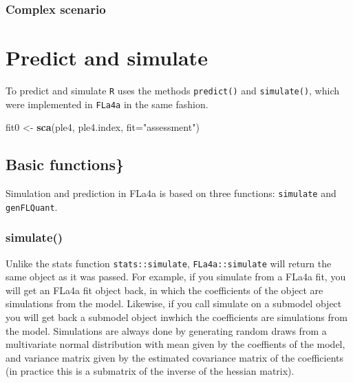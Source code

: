 \documentclass[
]{book}
\newenvironment{Shaded}{\begin{snugshade}}{\end{snugshade}}
\newcommand{\AttributeTok}[1]{\textcolor[rgb]{0.13,0.29,0.53}{#1}}
\newcommand{\FunctionTok}[1]{\textcolor[rgb]{0.13,0.29,0.53}{\textbf{#1}}}
\newcommand{\NormalTok}[1]{#1}
\newcommand{\OtherTok}[1]{\textcolor[rgb]{0.56,0.35,0.01}{#1}}
\newcommand{\StringTok}[1]{\textcolor[rgb]{0.31,0.60,0.02}{#1}}
\begin{document}
\hypertarget{complex-scenario}{%
\subsection{Complex scenario}\label{complex-scenario}}

\hypertarget{predict-and-simulate}{%
\chapter{\texorpdfstring{Predict and simulate \label{sec:predsim}}{Predict and simulate }}\label{predict-and-simulate}}

To predict and simulate \texttt{R} uses the methods \texttt{predict()} and \texttt{simulate()}, which were implemented in \texttt{FLa4a} in the same fashion.

\begin{Shaded}
\begin{Highlighting}[]
\NormalTok{fit0 }\OtherTok{\textless{}{-}} \FunctionTok{sca}\NormalTok{(ple4, ple4.index, }\AttributeTok{fit=}\StringTok{"assessment"}\NormalTok{)}
\end{Highlighting}
\end{Shaded}

\hypertarget{basic-functions}{%
\section{Basic functions\}}\label{basic-functions}}

Simulation and prediction in FLa4a is based on three functions: \texttt{simulate} and \texttt{genFLQuant}.

\hypertarget{simulate}{%
\subsection{simulate()}\label{simulate}}

Unlike the stats function \texttt{stats::simulate}, \texttt{FLa4a::simulate} will return the same object as it was passed. For example, if you simulate from a FLa4a fit, you will get an FLa4a fit object back, in which the coefficients of the object are simulations from the model. Likewise, if you call simulate on a submodel object you will get back a submodel object inwhich the coefficients are simulations from the model. Simulations are always done by generating random draws from a multivariate normal distribution with mean given by the coeffients of the model, and variance matrix given by the estimated covariance matrix of the coefficients (in practice this is a submatrix of the inverse of the hessian matrix).
\end{document}

